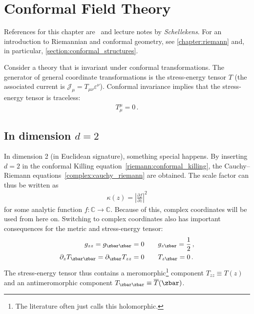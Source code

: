\chapter{Conformal Field Theory}\label{chapter:cft}

    References for this chapter are~\citet{schottenloher_mathematical_2008,gui_lectures_2023,fuchs_algebraic_2023} and lecture notes by \textit{Schellekens}. For an introduction to Riemannian and conformal geometry, see \cref{chapter:riemann} and, in particular, \cref{section:conformal_structures}.

    \begin{property}
        Consider a theory that is invariant under conformal transformations. The generator of general coordinate transformations is the stress-energy tensor $T$ (the associated current is $\mathcal{J}_\mu = T_{\mu\nu}\varepsilon^\nu$). Conformal invariance implies that the stress-energy tensor is traceless:
        \begin{gather}
            T^\mu_\mu = 0\,.
        \end{gather}
    \end{property}

\section{\texorpdfstring{In dimension $d=2$}{In dimension d=2}}

    In dimension 2 (in Euclidean signature), something special happens. By inserting $d=2$ in the conformal Killing equation~\eqref{riemann:conformal_killing}, the Cauchy--Riemann equations~\ref{complex:cauchy_riemann} are obtained. The scale factor can thus be written as
    \begin{gather}
        \kappa(z) = \left|\frac{\partial f}{\partial z}\right|^2
    \end{gather}
    for some analytic function $f:\mathbb{C}\rightarrow\mathbb{C}$. Because of this, complex coordinates will be used from here on. Switching to complex coordinates also has important consequences for the metric and stress-energy tensor:
    \begin{gather}
        \begin{aligned}
            g_{zz} = g_{\zbar\zbar} = 0&\qquad g_{z\zbar} = \frac{1}{2}\,,\\
            \partial_zT_{\zbar\zbar} = \partial_{\zbar} T_{zz} = 0&\qquad T_{z\zbar} = 0\,.
        \end{aligned}
    \end{gather}
    The stress-energy tensor thus contains a meromorphic\footnote{The literature often just calls this holomorphic.} component $T_{zz}\equiv T(z)$ and an antimeromorphic component $T_{\zbar\zbar}\equiv\overline{T}(\zbar)$.

